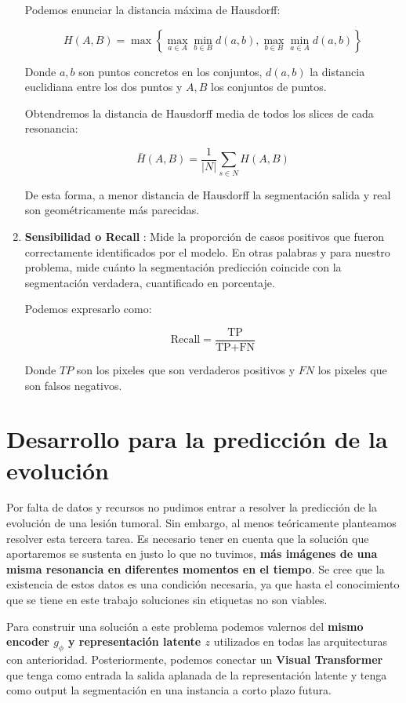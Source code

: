 \begin{enumerate}
	Podemos enunciar la distancia máxima de Hausdorff:
	
	$$ H(A, B) = \max \left\{ \max_{a \in A} \min_{b \in B} d(a, b), \max_{b \in B} \min_{a \in A} d(a, b) \right\} $$
	
	Donde $a, b$ son puntos concretos en los conjuntos, $d(a, b)$ la distancia euclidiana entre los dos puntos y $A, B$ los conjuntos de puntos.
	
	Obtendremos la distancia de Hausdorff media de todos los slices de cada resonancia:
	
	$$ \bar{H}(A, B) = \frac{1}{|N|} \sum_{s \in N} H(A, B) $$
	
	De esta forma, a menor distancia de Hausdorff la segmentación salida y real son geométricamente más parecidas.
	
	\item \textbf{Sensibilidad o Recall} : Mide la proporción de casos positivos que fueron correctamente identificados por el modelo. En otras palabras y para nuestro problema, mide cuánto la segmentación predicción coincide con la segmentación verdadera, cuantificado en porcentaje.
	
	Podemos expresarlo como:
	
	$$ \text{Recall} = \frac{\text{TP}}{\text{TP} + \text{FN}} $$
	
	Donde $TP$ son los pixeles que son verdaderos positivos y $FN$ los pixeles que son falsos negativos.
	
\end{enumerate}

\section{Desarrollo para la predicción de la evolución}

Por falta de datos y recursos no pudimos entrar a resolver la predicción de la evolución de una lesión tumoral. Sin embargo, al menos teóricamente planteamos resolver esta tercera tarea. Es necesario tener en cuenta que la solución que aportaremos se sustenta en justo lo que no tuvimos, \textbf{más imágenes de una misma resonancia en diferentes momentos en el tiempo}. Se cree que la existencia de estos datos es una condición necesaria, ya que hasta el conocimiento que se tiene en este trabajo soluciones sin etiquetas no son viables.

Para construir una solución a este problema podemos valernos del \textbf{mismo encoder $g_{\phi}$ y representación latente $z$} utilizados en todas las arquitecturas con anterioridad. Posteriormente, podemos conectar un \textbf{Visual Transformer} que tenga como entrada la salida aplanada de la representación latente y tenga como output la segmentación en una instancia a corto plazo futura.

